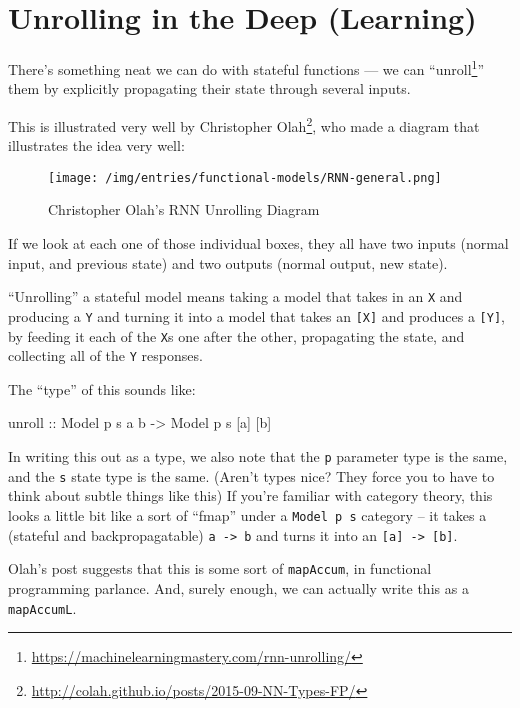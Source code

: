 \documentclass[]{article}
\newenvironment{Shaded}{}{}
\newcommand{\DataTypeTok}[1]{\textcolor[rgb]{0.56,0.13,0.00}{#1}}
\newcommand{\NormalTok}[1]{#1}
\newcommand{\OtherTok}[1]{\textcolor[rgb]{0.00,0.44,0.13}{#1}}
\renewcommand{\href}[2]{#2\footnote{\url{#1}}}
\begin{document}
\section{Unrolling in the Deep (Learning)}\label{unrolling-in-the-deep-learning}

There's something neat we can do with stateful functions --- we can
``\href{https://machinelearningmastery.com/rnn-unrolling/}{unroll}'' them by
explicitly propagating their state through several inputs.

This is illustrated very well by
\href{http://colah.github.io/posts/2015-09-NN-Types-FP/}{Christopher Olah}, who
made a diagram that illustrates the idea very well:

\begin{figure}
\centering
\texttt{[image: /img/entries/functional-models/RNN-general.png]}
\caption{Christopher Olah's RNN Unrolling Diagram}
\end{figure}

If we look at each one of those individual boxes, they all have two inputs
(normal input, and previous state) and two outputs (normal output, new state).

``Unrolling'' a stateful model means taking a model that takes in an \texttt{X}
and producing a \texttt{Y} and turning it into a model that takes an
\texttt{{[}X{]}} and produces a \texttt{{[}Y{]}}, by feeding it each of the
\texttt{X}s one after the other, propagating the state, and collecting all of
the \texttt{Y} responses.

The ``type'' of this sounds like:

\begin{Shaded}
\begin{Highlighting}[]
\OtherTok{unroll ::} \DataTypeTok{Model}\NormalTok{ p s a b }\OtherTok{{-}\textgreater{}} \DataTypeTok{Model}\NormalTok{ p s [a] [b]}
\end{Highlighting}
\end{Shaded}

In writing this out as a type, we also note that the \texttt{p} parameter type
is the same, and the \texttt{s} state type is the same. (Aren't types nice? They
force you to have to think about subtle things like this) If you're familiar
with category theory, this looks a little bit like a sort of ``fmap'' under a
\texttt{Model\ p\ s} category -- it takes a (stateful and backpropagatable)
\texttt{a\ -\textgreater{}\ b} and turns it into an
\texttt{{[}a{]}\ -\textgreater{}\ {[}b{]}}.

Olah's post suggests that this is some sort of \texttt{mapAccum}, in functional
programming parlance. And, surely enough, we can actually write this as a
\texttt{mapAccumL}.
\end{document}
